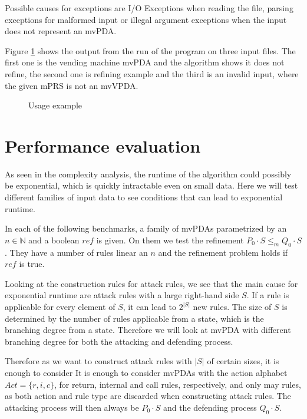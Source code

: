 Possible causes for exceptions are I/O Exceptions when reading the file,
parsing exceptions for malformed input or illegal argument exceptions
when the input does not represent an mvPDA.

\begin{example}
Figure \ref{listing:usage-output} shows the output from the run
of the program on three input files. The first one is the vending machine mvPDA
and the algorithm shows it does not refine, the second one is refining example
and the third is an invalid input, where the given mPRS is not an mvVPDA.
\end{example}

\begin{figure}[ht]

\caption{Usage example}
\label{listing:usage-output}
\end{figure}

\section{Performance evaluation}

As seen in the complexity analysis, the runtime
of the algorithm could possibly be exponential,
which is quickly intractable even on small data.
Here we will test different families of input data
to see conditions that can lead to exponential runtime.

In each of the following benchmarks, a family
of mvPDAs parametrized by an $n ∈ ℕ$ and
a boolean $ref$ is given.
On them we test the refinement $P_0⋅S ≤_m Q_0⋅S$.
They have a number of rules linear an $n$
and the refinement problem holds if $ref$ is true.

Looking at the construction rules for attack rules,
we see that the main cause for exponential runtime
are attack rules with a large right-hand
side $S$. If a rule is applicable for
every element of $S$, it can lead to $2^{|S|}$
new rules. The size of $S$ is determined by
the number of rules applicable from
a state, which is the branching degree from a state.
Therefore we will look at
mvPDA with different branching degree
for both the attacking and defending process.

Therefore as we want to construct attack rules with $|S|$ of
certain sizes, it is enough to consider 
It is enough to consider mvPDAs with the action alphabet
$Act = \{ r, i, c \}$, for return, internal and
call rules, respectively, and only may rules,
as both action and rule type are discarded when constructing
attack rules. The attacking process will then always be
$P_0⋅S$ and the defending process $Q_0⋅S$.

